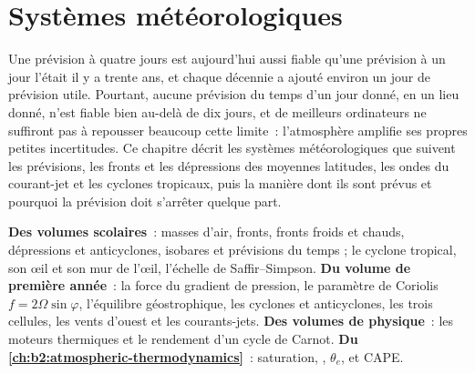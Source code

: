 \chapter{Systèmes météorologiques}\label{ch:b2:weather-systems}

Une prévision à quatre jours est aujourd'hui aussi fiable qu'une prévision à un jour l'était il y a trente
ans, et chaque décennie a ajouté environ un jour de prévision utile. Pourtant, aucune prévision du temps
d'un jour donné, en un lieu donné, n'est fiable bien au-delà de dix jours, et de meilleurs ordinateurs
ne suffiront pas à repousser beaucoup cette limite~: l'atmosphère amplifie ses propres petites incertitudes. Ce
chapitre décrit les systèmes météorologiques que suivent les prévisions, les fronts et les dépressions
des moyennes latitudes, les ondes du courant-jet et les cyclones tropicaux, puis la manière dont ils sont
prévus et pourquoi la prévision doit s'arrêter quelque part.

\begin{recall}
\textbf{Des volumes scolaires}~: masses d'air, fronts, fronts froids et chauds, dépressions et
anticyclones, isobares et prévisions du temps ; le cyclone tropical, son œil et son mur de l'œil, l'échelle de
Saffir--Simpson. \textbf{Du volume de première année}~: la force du gradient de pression, le paramètre de
Coriolis $f = 2\Omega\sin\varphi$, l'équilibre géostrophique, les cyclones et anticyclones, les trois
cellules, les vents d'ouest et les courants-jets. \textbf{Des volumes de physique}~: les moteurs thermiques
et le rendement d'un cycle de Carnot. \textbf{Du \cref{ch:b2:atmospheric-thermodynamics}}~:
saturation, , $\theta_e$,  et CAPE.
\end{recall}

